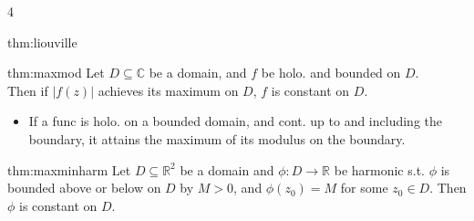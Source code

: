 \documentclass[landscape, 8pt]{extarticle}
\begin{document}
\begin{multicols*}{4}
\begin{thm}{thm:liouville}{ }
	\end{thm}
	
	
	\begin{thm}{thm:maxmod}{ }
		Let $D \subseteq \mathbb{C}$ be a domain, and $f$ be holo. and bounded on $D$.\\
		Then if $\left|f(z)\right|$ achieves its maximum on $D$, $f$ is constant on $D$.
		\begin{itemize}
			\item If a func is holo. on a bounded domain, and cont. up to and including the boundary, it attains the maximum of its modulus on the boundary.
		\end{itemize}
	\end{thm}
	
	
	\begin{thm-s}{thm:maxminharm}{ }
		Let $D \subseteq \mathbb{R}^2$  be a domain and $\phi : D \to \mathbb{R}$ be harmonic s.t. $\phi$ is bounded above or below on $D$ by $M > 0$, and $\phi(z_0) = M$ for some $z_0 \in D$. Then $\phi$ is constant on $D$.
		
		
	\end{thm-s}
	
	
	\end{multicols*}	
	
	\newpage
	
\end{document}
